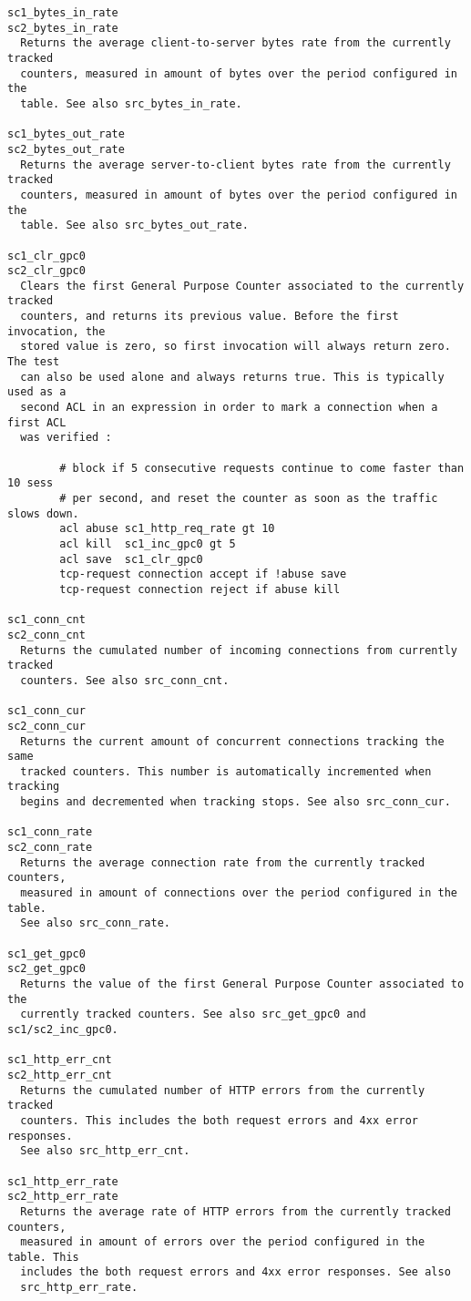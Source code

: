 \begin{verbatim}
sc1_bytes_in_rate
sc2_bytes_in_rate
  Returns the average client-to-server bytes rate from the currently tracked
  counters, measured in amount of bytes over the period configured in the
  table. See also src_bytes_in_rate.

sc1_bytes_out_rate
sc2_bytes_out_rate
  Returns the average server-to-client bytes rate from the currently tracked
  counters, measured in amount of bytes over the period configured in the
  table. See also src_bytes_out_rate.

sc1_clr_gpc0
sc2_clr_gpc0
  Clears the first General Purpose Counter associated to the currently tracked
  counters, and returns its previous value. Before the first invocation, the
  stored value is zero, so first invocation will always return zero. The test
  can also be used alone and always returns true. This is typically used as a
  second ACL in an expression in order to mark a connection when a first ACL
  was verified :

        # block if 5 consecutive requests continue to come faster than 10 sess
        # per second, and reset the counter as soon as the traffic slows down.
        acl abuse sc1_http_req_rate gt 10
        acl kill  sc1_inc_gpc0 gt 5
        acl save  sc1_clr_gpc0
        tcp-request connection accept if !abuse save
        tcp-request connection reject if abuse kill

sc1_conn_cnt
sc2_conn_cnt
  Returns the cumulated number of incoming connections from currently tracked
  counters. See also src_conn_cnt.

sc1_conn_cur
sc2_conn_cur
  Returns the current amount of concurrent connections tracking the same
  tracked counters. This number is automatically incremented when tracking
  begins and decremented when tracking stops. See also src_conn_cur.

sc1_conn_rate
sc2_conn_rate
  Returns the average connection rate from the currently tracked counters,
  measured in amount of connections over the period configured in the table.
  See also src_conn_rate.

sc1_get_gpc0
sc2_get_gpc0
  Returns the value of the first General Purpose Counter associated to the
  currently tracked counters. See also src_get_gpc0 and sc1/sc2_inc_gpc0.

sc1_http_err_cnt
sc2_http_err_cnt
  Returns the cumulated number of HTTP errors from the currently tracked
  counters. This includes the both request errors and 4xx error responses.
  See also src_http_err_cnt.

sc1_http_err_rate
sc2_http_err_rate
  Returns the average rate of HTTP errors from the currently tracked counters,
  measured in amount of errors over the period configured in the table. This
  includes the both request errors and 4xx error responses. See also
  src_http_err_rate.


\end{verbatim}
